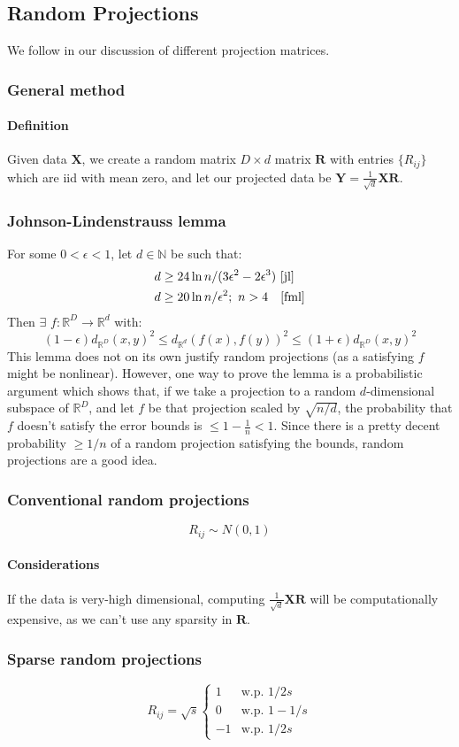 \documentclass[12pt,a4paper]{article}
\newcommand{\1}[1]{\mathds{1}\left[#1\right]}
\newcommand{\R}{\mathbb{R}}
\newcommand{\B}[1]{\mathbf{#1}}
\begin{document}
\subsection{Random Projections}
We follow \cite{verysparse} in our discussion of different projection matrices.
\subsubsection{General method}
\paragraph{Definition} Given data $\B X$, we create a random matrix $D\times d$ matrix $\B R$ with entries $\{R_{ij}\}$ which are iid with mean zero, and let our projected data be $\B Y=\frac{1}{\sqrt{d}}\B X \B R$.
\subsubsection{Johnson-Lindenstrauss lemma}
For some $0<\epsilon<1$, let $d\in \mathbb{N}$ be such that:
\begin{align*}
d&\geq 24\ln n/(3\epsilon^2-2\epsilon^3)\ \text{\cite{jl}}\\
d&\geq 20\ln n/\epsilon^2;\ n>4\quad \text{\cite{fml}}
\end{align*}Then $\exists$ $f:\R^D\to\R^d$ with:
\[(1-\epsilon)d_{\R^D}(x,y)^2\leq d_{\R^d}(f(x),f(y))^2\leq (1+\epsilon)d_{\R^D}(x,y)^2\]
This lemma does not on its own justify random projections (as a satisfying $f$ might be nonlinear). However, one way to prove the lemma is a probabilistic argument which shows that, if we take a projection to a random $d$-dimensional subspace of $\R^D$, and let $f$ be that projection scaled by $\sqrt{n/d}$, the probability that $f$ doesn't satisfy the error bounds is $\leq 1-\frac{1}{n}<1$. Since there is a pretty decent probability $\geq 1/n$ of a random projection satisfying the bounds, random projections are a good idea.
\subsubsection{Conventional random projections}
\[R_{ij}\sim N(0,1)\]
\paragraph{Considerations} If the data is very-high dimensional, computing $\frac{1}{\sqrt{d}}\B X\B R$ will be computationally expensive, as we can't use any sparsity in $\B R$.
\subsubsection{Sparse random projections}\label{sec:sparserp}
\[R_{ij}=\sqrt{s}\begin{cases}1 & \text{w.p. }1/2s \\ 0 & \text{w.p. }1-1/s \\ -1 & \text{w.p. }1/2s\end{cases}\]
\end{document}

